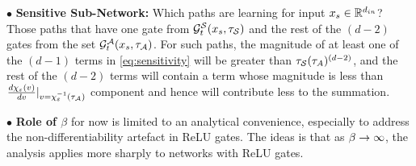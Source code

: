 $\bullet$ \textbf{Sensitive Sub-Network:} Which paths are learning for input $x_s\in\R^{d_{in}}$? \quad Those paths that have one gate from $\G^{\S}_t(x_s,\tau_{\S})$ and the rest of the $(d-2)$ gates from the set  $\G^{\A}_t(x_s,\tau_{\A})$. For such paths, the magnitude of at least one of the $(d-1)$ terms in \eqref{eq:sensitivity} will be greater than $\tau_{\S}(\tau_{A})^{(d-2)}$, and the rest of the $(d-2)$ terms will contain a term whose magnitude is less than $\frac{d \chi_{\epsilon}(v)}{d v}|_{v=\chi^{-1}_{\epsilon}(\tau_{\A})}$ component and hence will contribute less to the summation.

$\bullet$ \textbf{Role of $\beta$} for now is limited to an analytical convenience, especially to address the non-differentiability artefact in ReLU gates. The ideas is that as $\beta\ra\infty$, the analysis applies more sharply to networks with ReLU gates.
